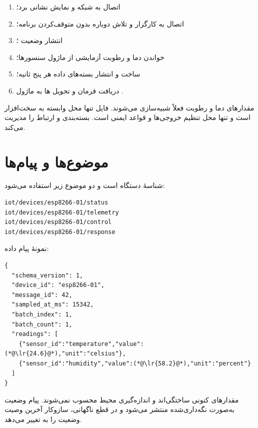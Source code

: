 \begin{enumerate}
  \item اتصال به شبکه و نمایش نشانی برد؛
  \item اتصال به کارگزار و تلاش دوباره بدون متوقف‌کردن برنامه؛
  \item انتشار وضعیت
  ؛
  \item خواندن دما و رطوبت آزمایشی از ماژول سنسورها؛
  \item ساخت و انتشار بسته‌های داده هر پنج ثانیه؛
  \item دریافت فرمان و تحویل
  ها
  به ماژول
  .
\end{enumerate}

مقدارهای دما و رطوبت فعلاً شبیه‌سازی می‌شوند. فایل
تنها محل وابسته به سخت‌افزار است و
تنها محل تنظیم خروجی‌ها و قواعد ایمنی است.
بسته‌بندی و ارتباط را مدیریت می‌کند.

\section{موضوع‌ها و پیام‌ها}
شناسهٔ دستگاه
است و دو موضوع زیر استفاده می‌شود:

\begin{LTR}
\begin{lstlisting}
iot/devices/esp8266-01/status
iot/devices/esp8266-01/telemetry
iot/devices/esp8266-01/control
iot/devices/esp8266-01/response
\end{lstlisting}
\end{LTR}

نمونهٔ پیام داده:

\begin{LTR}
\begin{lstlisting}
{
  "schema_version": 1,
  "device_id": "esp8266-01",
  "message_id": 42,
  "sampled_at_ms": 15342,
  "batch_index": 1,
  "batch_count": 1,
  "readings": [
    {"sensor_id":"temperature","value":(*@\lr{24.6}@*),"unit":"celsius"},
    {"sensor_id":"humidity","value":(*@\lr{58.2}@*),"unit":"percent"}
  ]
}
\end{lstlisting}
\end{LTR}

مقدارهای کنونی ساختگی‌اند و اندازه‌گیری محیط محسوب نمی‌شوند. پیام وضعیت به‌صورت نگه‌داری‌شده منتشر می‌شود و در قطع ناگهانی، سازوکار آخرین وصیت
وضعیت را به
تغییر می‌دهد.

